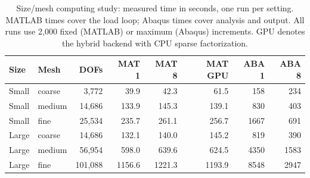 \begin{table}[htbp]
\centering\small
\caption{Size/mesh computing study: measured time in seconds, one run per setting. MATLAB times cover the load loop; Abaqus times cover analysis and output. All runs use 2{,}000 fixed (MATLAB) or maximum (Abaqus) increments. GPU denotes the hybrid backend with CPU sparse factorization.}
\label{tab:scaling}
\begin{tabular}{llrrrrrr}
\hline
Size & Mesh & DOFs & MAT 1 & MAT 8 & MAT GPU & ABA 1 & ABA 8 \\
\hline
Small & coarse & 3,772 & 39.9 & 42.3 & 61.5 & 158 & 234 \\
Small & medium & 14,686 & 133.9 & 145.3 & 139.1 & 830 & 403 \\
Small & fine & 25,534 & 235.7 & 261.1 & 256.7 & 1667 & 691 \\
Large & coarse & 14,686 & 132.1 & 140.0 & 145.2 & 819 & 390 \\
Large & medium & 56,954 & 598.0 & 639.6 & 624.5 & 4350 & 1583 \\
Large & fine & 101,088 & 1156.6 & 1221.3 & 1193.9 & 8548 & 2947 \\
\hline
\end{tabular}
\end{table}
